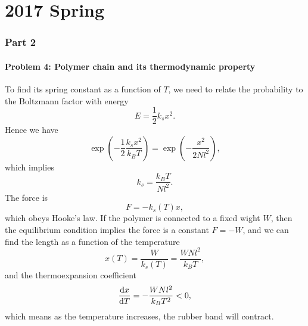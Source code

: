 \documentclass[10pt]{article}
\begin{document}
\part{2017 Spring}
\section{Part 2}
\subsection{Problem 4: Polymer chain and its thermodynamic property}
To find its spring constant as a function of $T$, we need to relate the probability to the Boltzmann factor with energy 
\begin{equation}
	E = \frac{1}{2} k_s x^2.
\end{equation}
Hence we have
\begin{equation}
	\exp(-\frac{1}{2} \frac{k_s x^2}{k_B T}) = \exp(-\frac{x^2}{2Nl^2}),
\end{equation}
which implies 
\begin{equation}
	k_s = \frac{k_B T}{Nl^2}.
\end{equation}
The force is 
\begin{equation}
	F = - k_s(T) x,
\end{equation}
which obeys Hooke's law. If the polymer is connected to a fixed wight $W$, then the equilibrium condition implies the force is a constant $F = -W$, and we can find the length as a function of the temperature 
\begin{equation}
	x(T) = \frac{W}{k_s(T)} = \frac{WNl^2}{k_B T},
\end{equation}
and the thermoexpansion coefficient 
\begin{equation}
	\dv{x}{T} = - \frac{WNl^2}{k_B T^2} < 0,
\end{equation}
which means as the temperature increases, the rubber band will contract.
\end{document}

